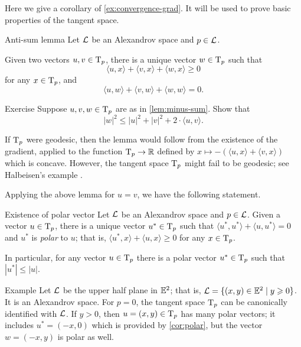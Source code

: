 Here we give a corollary of \ref{ex:convergence-grad}.
It will be used to prove basic properties of the tangent space.


\begin{thm}{Anti-sum lemma}\label{lem:minus-sum} 
Let $\mathcal{L}$ be an Alexandrov space and $p\in \mathcal{L}$.

Given two vectors $u,v\in \mathrm{T}_p$, there is a unique vector $w\in \mathrm{T}_p$ such that
\[\langle u,x\rangle +\langle v,x\rangle +\langle w,x\rangle \ge 0\]
for any $x\in \mathrm{T}_p$, and
\[\langle u,w\rangle +\langle v,w\rangle +\langle w,w\rangle =0.\]

\end{thm}

\begin{thm}{Exercise}\label{ex:|antisum|}
Suppose $u,v, w\in \mathrm{T}_p$ are as in \ref{lem:minus-sum}.
Show that 
\[|w|^2\le |u|^2+|v|^2+2\cdot\langle u,v\rangle.\]

\end{thm}


If $\mathrm{T}_p$ were geodesic, then the lemma would follow from the existence  of the gradient, applied to the function $\mathrm{T}_p\to \mathbb{R}$ defined by $x\mapsto -(\langle u,x\rangle +\langle v,x\rangle )$ which is concave.
However, the tangent space $\mathrm{T}_p$ might fail to be geodesic; see  Halbeisen's example \cite{alexander-kapovitch-petrunin2024}.


Applying the above lemma for $u=v$, we have the following statement.

\begin{thm}{Existence of polar vector}\label{cor:polar}
Let $\mathcal{L}$ be an Alexandrov space 
and $p\in \mathcal{L}$. 
Given a vector $u\in \mathrm{T}_p$,  there is a unique vector $u^*\in\mathrm{T}_p$ such that $\langle u^*,u^*\rangle +\langle u,u^*\rangle = 0$ and
$u^*$ is \emph{polar} to $u$;
that is,
 $\langle u^*,x\rangle +\langle u,x\rangle \ge 0$ for any $x\in \mathrm{T}_p$.

In particular, for any vector $u\in \mathrm{T}_p$ there is a polar vector $u^*\in\mathrm{T}_p$ such that
$|u^*|\le |u|$.
\end{thm}

\begin{thm}{Example}
Let $\mathcal{L}$ be the upper half plane in $\mathbb{E}^2$;
that is, $\spc{L}\z=\{(x,y)\in \EE^2\mid y\ge 0\}$.
It is an Alexandrov space.
For $p=0$, the tangent space $\mathrm{T}_p$ can be canonically identified with $\mathcal{L}$.
If $y>0$, then $u=(x,y)\in \mathrm{T}_p$ has many polar vectors;
it includes $u^*=(-x,0)$ which is provided by \ref{cor:polar},
but the vector $w=(-x,y)$ is polar as well.
\end{thm}

